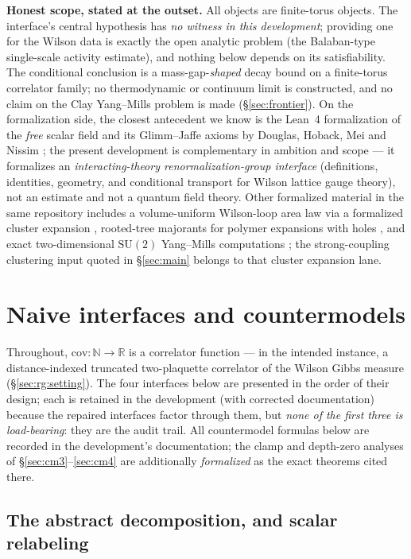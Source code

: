 \documentclass[11pt]{article}
\theoremstyle{definition}
\newcommand{\SU}{\mathrm{SU}}
\begin{document}
\medskip
\noindent\textbf{Honest scope, stated at the outset.}  All objects are
finite-torus objects.  The interface's central hypothesis has
\emph{no witness in this development}; providing one for the Wilson
data is exactly the open analytic problem (the Balaban-type
single-scale activity estimate), and nothing below depends on its
satisfiability.  The conditional conclusion is a mass-gap-\emph{shaped}
decay bound on a finite-torus correlator family; no thermodynamic or
continuum limit is constructed, and no claim on the Clay Yang--Mills
problem is made (\S\ref{sec:frontier}).  On the formalization side,
the closest antecedent we know is the Lean~4 formalization of the
\emph{free} scalar field and its Glimm--Jaffe axioms by Douglas,
Hoback, Mei and Nissim \cite{DHMN26}; the present development is
complementary in ambition and scope --- it formalizes an
\emph{interacting-theory renormalization-group interface} (definitions,
identities, geometry, and conditional transport for Wilson lattice
gauge theory), not an estimate and not a quantum field theory.  Other
formalized material in the same repository includes a volume-uniform
Wilson-loop area law via a formalized cluster expansion
\cite{ErikssonAL}, rooted-tree majorants for polymer expansions with
holes \cite{ErikssonRT}, and exact two-dimensional $\SU(2)$
Yang--Mills computations \cite{Eriksson2D}; the strong-coupling
clustering input quoted in \S\ref{sec:main} belongs to that cluster
expansion lane.

\section{Naive interfaces and countermodels}\label{sec:counter}

Throughout, $\mathrm{cov} : \mathbb{N} \to \mathbb{R}$ is a correlator
function --- in the intended instance, a distance-indexed truncated
two-plaquette correlator of the Wilson Gibbs measure
(\S\ref{sec:rg:setting}).  The four interfaces below are presented in
the order of their design; each is retained in the development (with
corrected documentation) because the repaired interfaces factor
through them, but \emph{none of the first three is load-bearing}: they
are the audit trail.  All countermodel formulas below are recorded in
the development's documentation; the clamp and depth-zero analyses of
\S\ref{sec:cm3}--\ref{sec:cm4} are additionally \emph{formalized} as
the exact theorems cited there.

\subsection{The abstract decomposition, and scalar relabeling}
\label{sec:cm1}
\end{document}
